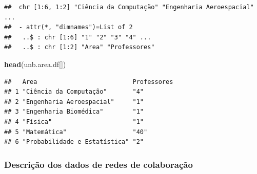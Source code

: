 \documentclass[]{article}
\newenvironment{Shaded}{\begin{snugshade}}{\end{snugshade}}
\newcommand{\KeywordTok}[1]{\textcolor[rgb]{0.13,0.29,0.53}{\textbf{#1}}}
\newcommand{\DataTypeTok}[1]{\textcolor[rgb]{0.13,0.29,0.53}{#1}}
\newcommand{\DecValTok}[1]{\textcolor[rgb]{0.00,0.00,0.81}{#1}}
\newcommand{\StringTok}[1]{\textcolor[rgb]{0.31,0.60,0.02}{#1}}
\newcommand{\ControlFlowTok}[1]{\textcolor[rgb]{0.13,0.29,0.53}{\textbf{#1}}}
\newcommand{\OperatorTok}[1]{\textcolor[rgb]{0.81,0.36,0.00}{\textbf{#1}}}
\newcommand{\NormalTok}[1]{#1}
\begin{document}
\begin{Shaded}
\end{Shaded}

\begin{verbatim}
##  chr [1:6, 1:2] "Ciência da Computação" "Engenharia Aeroespacial" ...
##  - attr(*, "dimnames")=List of 2
##   ..$ : chr [1:6] "1" "2" "3" "4" ...
##   ..$ : chr [1:2] "Area" "Professores"
\end{verbatim}

\begin{Shaded}
\begin{Highlighting}[]
\KeywordTok{head}\NormalTok{(unb.area.df[])}
\end{Highlighting}
\end{Shaded}

\begin{verbatim}
##   Area                          Professores
## 1 "Ciência da Computação"       "4"        
## 2 "Engenharia Aeroespacial"     "1"        
## 3 "Engenharia Biomédica"        "1"        
## 4 "Física"                      "1"        
## 5 "Matemática"                  "40"       
## 6 "Probabilidade e Estatística" "2"
\end{verbatim}

\subsubsection{Descrição dos dados de redes de
colaboração}\label{descricao-dos-dados-de-redes-de-colaboracao}
\end{document}
